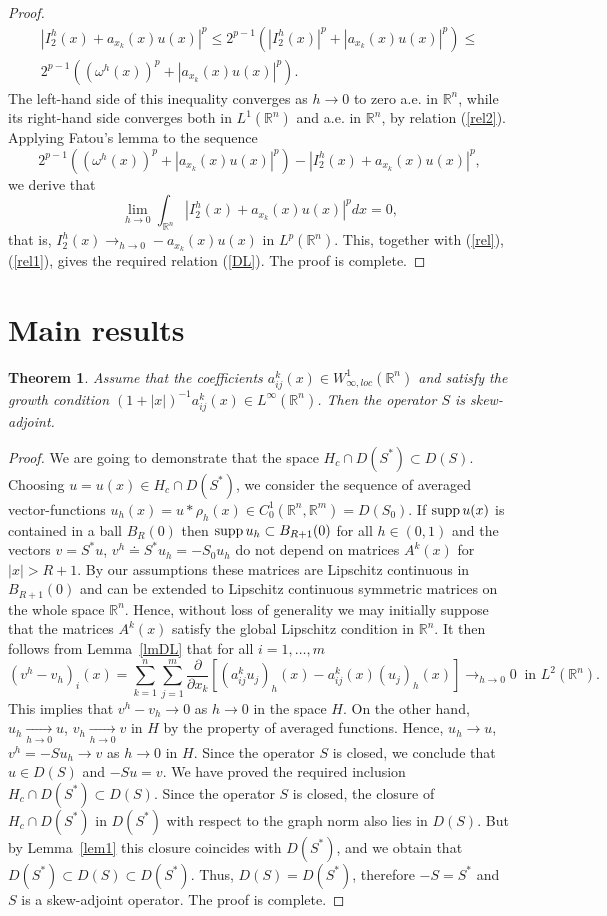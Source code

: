 \documentclass[12pt]{article}
\theoremstyle{plain}
\newtheorem{theorem}{Theorem}[section]
\theoremstyle{definition}
\numberwithin{equation}{section}
\newcommand{\R}{{\mathbb R}}
\newcommand{\supp}{\mathop{\rm supp}}
\begin{document}
\begin{proof}
\begin{align*}
|I_2^h(x)+a_{x_k}(x)u(x)|^p\le 2^{p-1}(|I_2^h(x)|^p+|a_{x_k}(x)u(x)|^p)\le \\ 2^{p-1}((\omega^h(x))^p+|a_{x_k}(x)u(x)|^p).
\end{align*}
The left-hand side of this inequality converges as $h\to 0$ to zero a.e. in $\R^n$, while its right-hand side converges both in  $L^1(\R^n)$ and a.e. in $\R^n$, by relation (\ref{rel2}). Applying Fatou's lemma to the sequence
\[
2^{p-1}((\omega^h(x))^p+|a_{x_k}(x)u(x)|^p)-|I_2^h(x)+a_{x_k}(x)u(x)|^p,
\]
we derive that
\[
\lim_{h\to 0} \int_{\R^n}|I_2^h(x)+a_{x_k}(x)u(x)|^pdx=0,
\]
that is, $\displaystyle I_2^h(x)\mathop{\to}_{h\to 0} -a_{x_k}(x)u(x)$ in $L^p(\R^n)$. This, together with  (\ref{rel}), (\ref{rel1}), gives the required relation (\ref{DL}). The proof is complete.
\end{proof}

\section{Main results}\label{secM}

\begin{theorem}\label{thM}
Assume that the coefficients $a^k_{ij}(x)\in W^1_{\infty,loc}(\R^n)$ and satisfy the growth condition $(1+|x|)^{-1}a^k_{ij}(x)\in L^\infty(\R^n)$. Then the operator $S$ is skew-adjoint.
\end{theorem}

\begin{proof}
We are going to demonstrate that the space $H_c\cap D(S^*)\subset D(S)$. Choosing $u=u(x)\in H_c\cap D(S^*)$, we consider the sequence of averaged vector-functions $u_h(x)=u*\rho_h(x)\in C_0^1(\R^n,\R^m)=D(S_0)$. If $\supp u(x)$ is contained in a ball $B_R(0)$ then $\supp u_h\subset B_{R+1}(0)$ for all $h\in (0,1)$ and the vectors $v=S^*u$, $v^h\doteq S^* u_h=-S_0u_h$ do not depend on matrices $A^k(x)$ for $|x|>R+1$. By our assumptions these matrices are Lipschitz continuous in $B_{R+1}(0)$ and can be extended to Lipschitz continuous symmetric matrices on the whole space $\R^n$. Hence, without loss of generality we may initially suppose that the matrices $A^k(x)$ satisfy the global Lipschitz condition in $\R^n$.
It then follows from Lemma~\ref{lmDL} that for all $i=1,\ldots,m$
\[(v^h-v_h)_i(x)=\sum_{k=1}^n \sum_{j=1}^m \frac{\partial}{\partial x_k}[(a^k_{ij}u_j)_h(x)-a^k_{ij}(x)(u_j)_h(x)]
\mathop{\to}_{h\to 0} 0 \ \mbox{ in } L^2(\R^n). \]
This implies that $v^h-v_h\to 0$ as $h\to 0$ in the space $H$. On the other hand, $u_h\mathop{\to}\limits_{h\to 0} u$,  $v_h\mathop{\to}\limits_{h\to 0} v$ in $H$ by the property of averaged functions. Hence, $u_h\to u$, $v^h=-Su_h\to v$ as $h\to 0$ in $H$. Since the operator $S$ is closed, we conclude that $u\in D(S)$ and $-Su=v$. We have proved the required inclusion $H_c\cap D(S^*)\subset D(S)$. Since the operator $S$ is closed, the closure of $H_c\cap D(S^*)$ in $D(S^*)$ with respect to the graph norm also lies in $D(S)$. But by Lemma~\ref{lem1} this closure coincides with $D(S^*)$, and we obtain that $D(S^*)\subset D(S)\subset D(S^*)$. Thus, $D(S)=D(S^*)$, therefore $-S=S^*$ and $S$ is a skew-adjoint operator. The proof is complete.
\end{proof}
\end{document}
